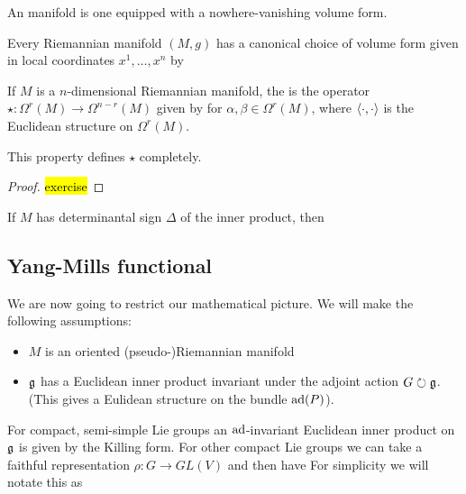 \documentclass{article}
\begin{document}
\begin{definition}
	An  manifold is one equipped with a nowhere-vanishing volume form. 
\end{definition}

\begin{lemma}
	Every Riemannian manifold $(M,g)$ has a canonical choice of volume form given in local coordinates $x^1, \dots, x^n$ by 
\end{lemma}

\begin{definition}
	If $M$ is a $n$-dimensional Riemannian manifold, the  is the operator $\star : \Omega^r(M) \to \Omega^{n-r}(M)$ given by 
for $\alpha,\beta \in \Omega^r(M)$, where $\left\langle \cdot,\cdot \right\rangle$ is the Euclidean structure on $\Omega^r(M)$. 
\end{definition}

\begin{lemma}
	This property defines $\star$ completely. 
\end{lemma}
\begin{proof}
	\hl{exercise}
	\end{proof}

\begin{prop}
	If $M$ has determinantal sign $\Delta$ of the inner product, then 
\end{prop}
\subsection{Yang-Mills functional}
We are now going to restrict our mathematical picture. We will make the following assumptions:
\begin{itemize}
	\item $M$ is an oriented (pseudo-)Riemannian manifold
	\item $\mathfrak{g}$ has a Euclidean inner product invariant under the adjoint action $G \circlearrowright \mathfrak{g}$. (This gives a Eulidean structure on the bundle $\operatorname{ad}(P)$). 
\end{itemize}

\begin{remark}
For compact, semi-simple Lie groups an $\operatorname{ad}$-invariant Euclidean inner product on $\mathfrak{g}$ is given by the Killing form. For other compact Lie groups we can take a faithful representation $\rho : G \to GL(V)$ and then have 
For simplicity we will notate this as 
\end{remark}
\end{document}
